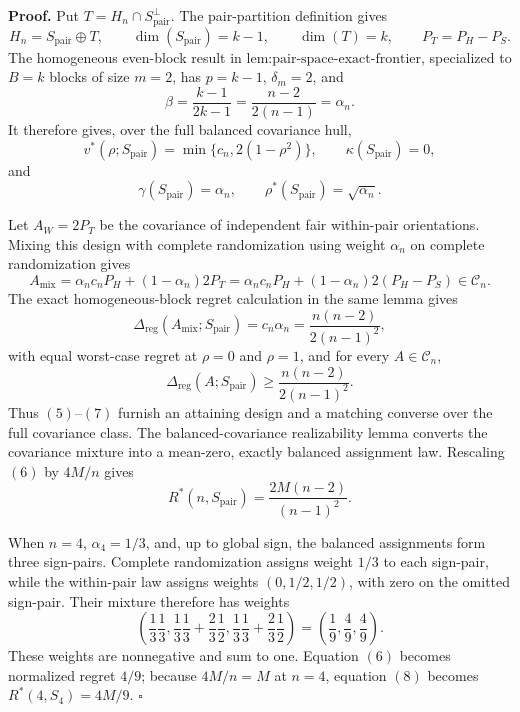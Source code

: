 \textbf{Proof.}
Put \(T=H_n\cap S_{\mathrm{pair}}^\perp\).  The pair-partition definition gives
\[
H_n=S_{\mathrm{pair}}\mathbin\oplus T,
\qquad
\dim(S_{\mathrm{pair}})=k-1,
\qquad
\dim(T)=k,
\qquad
P_T=P_H-P_S.
\tag{1}
\]
The homogeneous even-block result in \(\text{lem:pair-space-exact-frontier}\), specialized to \(B=k\) blocks of size \(m=2\), has \(p=k-1\), \(\delta_m=2\), and
\[
\beta=\frac{k-1}{2k-1}
=\frac{n-2}{2(n-1)}=\alpha_n.
\tag{2}
\]
It therefore gives, over the full balanced covariance hull,
\[
v^*(\rho;S_{\mathrm{pair}})
=\min\{c_n,2(1-\rho^2)\},
\qquad
\kappa(S_{\mathrm{pair}})=0,
\tag{3}
\]
and
\[
\gamma(S_{\mathrm{pair}})=\alpha_n,
\qquad
\rho^*(S_{\mathrm{pair}})=\sqrt{\alpha_n}.
\tag{4}
\]

Let \(A_W=2P_T\) be the covariance of independent fair within-pair orientations.  Mixing this design with complete randomization using weight \(\alpha_n\) on complete randomization gives
\[
A_{\mathrm{mix}}
=\alpha_nc_nP_H+(1-\alpha_n)2P_T
=\alpha_nc_nP_H+(1-\alpha_n)2(P_H-P_S)
\in\mathcal C_n.
\tag{5}
\]
The exact homogeneous-block regret calculation in the same lemma gives
\[
\Delta_{\mathrm{reg}}(A_{\mathrm{mix}};S_{\mathrm{pair}})
=c_n\alpha_n
=\frac{n(n-2)}{2(n-1)^2},
\tag{6}
\]
with equal worst-case regret at \(\rho=0\) and \(\rho=1\), and for every \(A\in\mathcal C_n\),
\[
\Delta_{\mathrm{reg}}(A;S_{\mathrm{pair}})
\geq\frac{n(n-2)}{2(n-1)^2}.
\tag{7}
\]
Thus \((5)\)--\((7)\) furnish an attaining design and a matching converse over the full covariance class.  The balanced-covariance realizability lemma converts the covariance mixture into a mean-zero, exactly balanced assignment law.  Rescaling \((6)\) by \(4M/n\) gives
\[
R^*(n,S_{\mathrm{pair}})
=\frac{2M(n-2)}{(n-1)^2}.
\tag{8}
\]

When \(n=4\), \(\alpha_4=1/3\), and, up to global sign, the balanced assignments form three sign-pairs.  Complete randomization assigns weight \(1/3\) to each sign-pair, while the within-pair law assigns weights \((0,1/2,1/2)\), with zero on the omitted sign-pair.  Their mixture therefore has weights
\[
\left(
\frac13\frac13,
\frac13\frac13+\frac23\frac12,
\frac13\frac13+\frac23\frac12
\right)
=\left(\frac19,\frac49,\frac49\right).
\tag{9}
\]
These weights are nonnegative and sum to one.  Equation \((6)\) becomes normalized regret \(4/9\); because \(4M/n=M\) at \(n=4\), equation \((8)\) becomes \(R^*(4,S_4)=4M/9\). \(\square\)